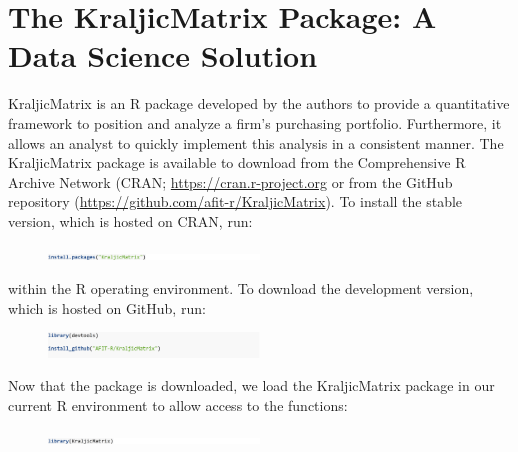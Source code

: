 \documentclass[twocolumn]{svjour3}       %
\begin{document}
\section{The KraljicMatrix Package: A Data Science Solution}
\label{sec:4}

KraljicMatrix \citep{bmof17} is an R package developed by the authors to provide a quantitative framework to position and analyze a firm's purchasing portfolio. Furthermore, it allows an analyst to quickly implement this analysis in a consistent manner. The KraljicMatrix package is available to download from the Comprehensive R Archive Network (CRAN; \url{https://cran.r-project.org} or from the GitHub repository (\url{https://github.com/afit-r/KraljicMatrix}). To install the stable version, which is hosted on CRAN, run:
\begin{figure}[!htb]
  \includegraphics[width=0.5\textwidth]{code1.png}
\end{figure}
within the R operating environment. To download the development version, which is hosted on GitHub, run:
\begin{figure}[!htb]
  \includegraphics[width=0.5\textwidth]{code2.png}
\end{figure}
Now that the package is downloaded, we load the KraljicMatrix package in our current R environment to allow access to the functions:
\begin{figure}[!htb]
  \includegraphics[width=0.5\textwidth]{code3.png}
\end{figure}
\end{document}
